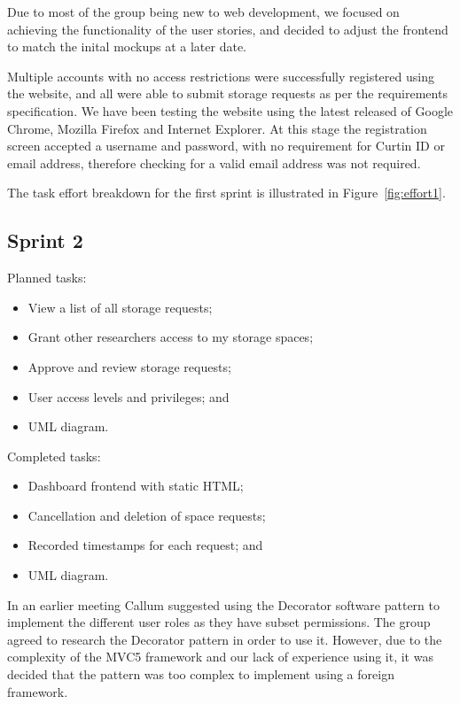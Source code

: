 \documentclass[a4paper,titlepage,12pt]{article}
\begin{document}
Due to most of the group being new to web development, we focused on achieving
the functionality of the user stories, and decided to adjust the frontend to
match the inital mockups at a later date.

Multiple accounts with no access restrictions were successfully registered
using the website, and all were able to submit storage requests as per the
requirements specification. We have been testing the website using the latest
released of Google Chrome, Mozilla Firefox and Internet Explorer. At this stage
the registration screen accepted a username and password, with no requirement
for Curtin ID or email address, therefore checking for a valid email address
was not required.

The task effort breakdown for the first sprint is illustrated in
Figure~\ref{fig:effort1}.

\newpage

\subsection{Sprint 2}

Planned tasks:

\begin{itemize}
	\item View a list of all storage requests;
	\item Grant other researchers access to my storage spaces;
	\item Approve and review storage requests;
	\item User access levels and privileges; and
	\item UML diagram.
\end{itemize}

Completed tasks:

\begin{itemize}
	\item Dashboard frontend with static HTML;
	\item Cancellation and deletion of space requests;
	\item Recorded timestamps for each request; and
	\item UML diagram.
\end{itemize}

In an earlier meeting Callum suggested using the Decorator software pattern to
implement the different user roles as they have subset permissions. The group
agreed to research the Decorator pattern in order to use it. However, due to
the complexity of the MVC5 framework and our lack of experience using it, it
was decided that the pattern was too complex to implement using a foreign
framework.
\end{document}
